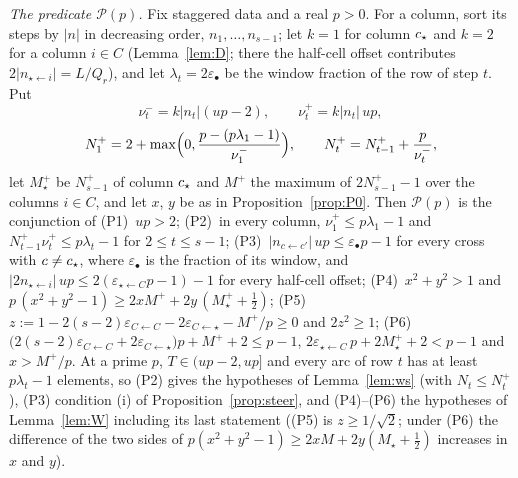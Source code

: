 \emph{The predicate $\mathcal P(p)$.} Fix staggered data and a real $p>0$. For a column, sort its steps by $|n|$ in decreasing order, $n_1,\dots,n_{s-1}$; let $k=1$ for column $c_{\star}$ and $k=2$ for a column $i\in C$ (Lemma~\ref{lem:D}; there the half-cell offset contributes $2|n_{\star\leftarrow i}|=L/Q_r$), and let $\lambda_t=2\varepsilon_\bullet$ be the window fraction of the row of step $t$. Put
\[
\nu_t^-=k|n_t|(up-2),\qquad\nu_t^+=k|n_t|\,up,\]\[N_1^+=2+\max\Bigl(0,\frac{p-(p\lambda_1-1)}{\nu_1^-}\Bigr),\qquad N_t^+=N_{t-1}^++\frac p{\nu_t^-},
\]
let $M_\star^+$ be $N_{s-1}^+$ of column $c_{\star}$ and $M^+$ the maximum of $2N_{s-1}^+-1$ over the columns $i\in C$, and let $x$, $y$ be as in Proposition~\ref{prop:P0}. Then $\mathcal P(p)$ is the conjunction of
(P1)~$up>2$;
(P2)~in every column, $\nu_1^+\le p\lambda_1-1$ and $N_{t-1}^+\nu_t^+\le p\lambda_t-1$ for $2\le t\le s-1$;
(P3)~$|n_{c\leftarrow c'}|\,up\le\varepsilon_\bullet p-1$ for every cross with $c\ne c_{\star}$, where $\varepsilon_\bullet$ is the fraction of its window, and $|2n_{\star\leftarrow i}|\,up\le2(\varepsilon_{\star\leftarrow C}p-1)-1$ for every half-cell offset;
(P4)~$x^2+y^2>1$ and $p\,(x^2+y^2-1)\ge2xM^++2y\,(M_\star^++\frac12)$;
(P5)~$z:=1-2(s-2)\varepsilon_{C\leftarrow C}-2\varepsilon_{C\leftarrow\star}-M^+/p\ge0$ and $2z^2\ge1$;
(P6)~$\bigl(2(s-2)\varepsilon_{C\leftarrow C}+2\varepsilon_{C\leftarrow\star}\bigr)p+M^++2\le p-1$, $2\varepsilon_{\star\leftarrow C}\,p+2M_\star^++2<p-1$ and $x>M^+/p$.
At a prime $p$, $T\in(up-2,up]$ and every arc of row $t$ has at least $p\lambda_t-1$ elements, so (P2) gives the hypotheses of Lemma~\ref{lem:ws} (with $N_t\le N_t^+$), (P3) condition (i) of Proposition~\ref{prop:steer}, and (P4)--(P6) the hypotheses of Lemma~\ref{lem:W} including its last statement ((P5) is $z\ge1/\sqrt2$; under (P6) the difference of the two sides of $p(x^2+y^2-1)\ge2xM+2y(M_\star+\frac12)$ increases in $x$ and $y$).

